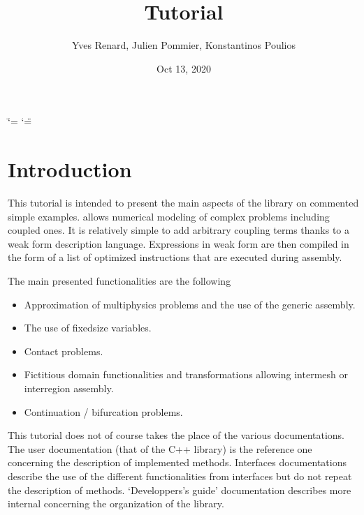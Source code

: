 \documentclass[a4paper,11pt,english]{sphinxmanual}
\title{Tutorial}
\date{Oct 13, 2020}
\author{Yves Renard, Julien Pommier, Konstantinos Poulios}
\begin{document}
\ifdefined\shorthandoff
  \ifnum\catcode`\=\string=\active\shorthandoff{=}\fi
  \ifnum\catcode`\"=\active{}\fi
\fi

\pagestyle{empty}
\sphinxmaketitle
\pagestyle{plain}
\sphinxtableofcontents
\pagestyle{normal}
\label{\detokenize{tutorial/index::doc}}



\chapter{Introduction}
\label{\detokenize{tutorial/intro:introduction}}\label{\detokenize{tutorial/intro:ud-intro-tut}}\label{\detokenize{tutorial/intro::doc}}
This tutorial is intended to present the main aspects of the  library  on commented simple examples.  allows numerical modeling of complex problems including coupled ones. It is relatively simple to add arbitrary coupling terms thanks to a weak form description language. Expressions in weak form are then compiled in the form of a list of optimized instructions that are executed during assembly.

The main presented functionalities are the following
\begin{itemize}
\item {} 
Approximation of multiphysics problems and the use of the generic assembly.

\item {} 
The use of fixed\sphinxhyphen{}size variables.

\item {} 
Contact problems.

\item {} 
Fictitious domain functionalities and transformations allowing inter\sphinxhyphen{}mesh or inter\sphinxhyphen{}region assembly.

\item {} 
Continuation / bifurcation problems.

\end{itemize}

This tutorial does not of course takes the place of the various documentations. The user documentation (that of the C++ library) is the reference one concerning the description of implemented methods. Interfaces documentations describe the use of the different functionalities from interfaces but do not repeat the description of methods. ‘Developpers’s guide’ documentation describes more internal concerning the organization of the library.
\end{document}
